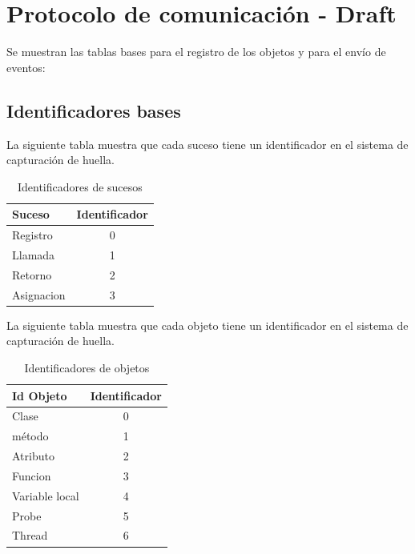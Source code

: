 \documentclass[10pt,a4paper]{article}
\begin{document}
\section{Protocolo de comunicación - Draft}

Se muestran las tablas bases para el registro de los objetos y para el envío de eventos:

\subsection{Identificadores bases}

La siguiente tabla muestra que cada suceso tiene un identificador en el sistema de capturación de huella.
\begin{table}[!h]
\begin{center}
\begin{tabular}{|l | c |}
\hline
Suceso & Identificador\\
\hline
Registro & 0\\
\hline
Llamada & 1\\
\hline
Retorno & 2\\
\hline
Asignacion & 3\\
\hline
\end{tabular}
\caption{Identificadores de sucesos} 
\end{center}
\end{table}

La siguiente tabla muestra que cada objeto tiene un identificador en el sistema de capturación de huella.
\begin{table}[!h]
\begin{center}
\begin{tabular}{|l | c |}
\hline
Id Objeto & Identificador\\
\hline
Clase & 0\\
\hline
método & 1\\
\hline
Atributo & 2\\
\hline
Funcion & 3\\
\hline
Variable local & 4\\
\hline
Probe & 5\\
\hline
Thread & 6\\
\hline
\end{tabular}
\caption{Identificadores de objetos} 
\end{center}
\end{table}
\\
\pagebreak
\end{document}
